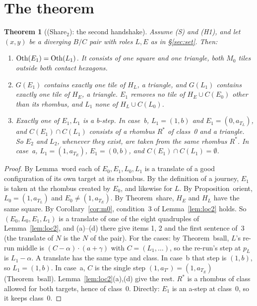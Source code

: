 \documentclass[11pt]{article}
\newtheorem{theorem}{Theorem}\newtheorem{lemma}[theorem]{Lemma}\newtheorem{proposition}[theorem]{Proposition}
\theoremstyle{definition}\newtheorem{definition}[theorem]{Definition}\newtheorem{remark}[theorem]{Remark}
\begin{document}
\section{The theorem}\label{sec:thm}
\begin{theorem}[(Share$_2$): the second handshake]\label{thm:share2}
Assume (S) and (H1), and let $(x,y)$ be a diverging $B/C$ pair with roles $L,E$ as in \S\ref{sec:set}. Then:
\begin{enumerate}
\item $\operatorname{Oth}(E_1)=\operatorname{Oth}(L_1)$. It consists of one square and one triangle, both $M_0$ tiles outside both contact hexagons.
\item $G(E_1)$ contains exactly one tile of $H_L$, a triangle, and $G(L_1)$ contains exactly one tile of $H_E$, a triangle. $E_1$ removes no tile of $H_E\cup C(E_0)$ other than its rhombus, and $L_1$ none of $H_L\cup C(L_0)$.
\item Exactly one of $E_1,L_1$ is a b-step. In case~b, $L_1=(1,b)$ and $E_1=(0,a_{T_L})$, and $C(E_1)\cap C(L_1)$ consists of a rhombus $R^*$ of class~0 and a triangle. So $E_2$ and $L_2$, whenever they exist, are taken from the same rhombus $R^*$. In case~a, $L_1=(1,a_{T_E})$, $E_1=(0,b)$, and $C(E_1)\cap C(L_1)=\emptyset$.
\end{enumerate}
\end{theorem}
\begin{proof}
By Lemma~word each of $E_0,E_1,L_0,L_1$ is a translate of a good configuration of its own target at its rhombus. By the definition of a journey, $E_1$ is taken at the rhombus created by $E_0$, and likewise for $L$. By Proposition~orient, $L_0=(1,a_{T_L})$ and $E_0\ne(1,a_{T_E})$. By Theorem~share, $H_E$ and $H_L$ have the same square. By Corollary~\ref{cor:m0}, condition~3 of Lemma~\ref{lem:loc2} holds. So $(E_0,L_0,E_1,L_1)$ is a translate of one of the eight quadruples of Lemma~\ref{lem:loc2}, and (a)--(d) there give items 1, 2 and the first sentence of~3 (the translate of $N$ is the $N$ of the pair).
For the cases: by Theorem~bsall, $L$'s re-run middle is $(C-\alpha)\cdot(a+\gamma)$ with $C=(L_1,\dots)$, so the re-run's step at $p_L$ is $L_1-\alpha$. A translate has the same type and class. In case~b that step is $(1,b)$, so $L_1=(1,b)$. In case~a, $C$ is the single step $(1,a_{T'})=(1,a_{T_E})$ (Theorem~bsall). Lemma~\ref{lem:loc2}(a),(d) give the rest. $R^*$ is a rhombus of class allowed for both targets, hence of class~0. Directly: $E_1$ is an a-step at class~0, so it keeps class~0.
\end{proof}
\end{document}
